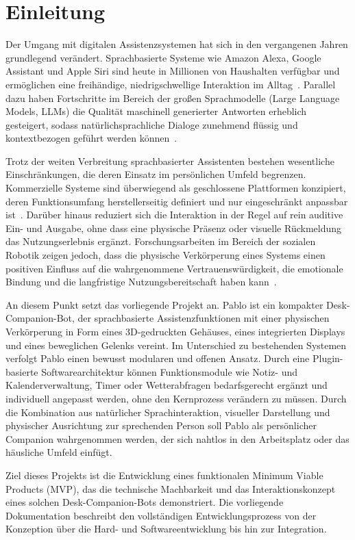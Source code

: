 \section{Einleitung}

Der Umgang mit digitalen Assistenzsystemen hat sich in den vergangenen Jahren grundlegend verändert.
Sprachbasierte Systeme wie Amazon Alexa, Google Assistant und Apple Siri sind heute in Millionen von Haushalten verfügbar und ermöglichen eine freihändige, niedrigschwellige Interaktion im Alltag~\cite{hoy2018alexa, kepuska2018next}.
Parallel dazu haben Fortschritte im Bereich der großen Sprachmodelle (Large Language Models, LLMs) die Qualität maschinell generierter Antworten erheblich gesteigert, sodass natürlichsprachliche Dialoge zunehmend flüssig und kontextbezogen geführt werden können~\cite{zhao2023survey}.

Trotz der weiten Verbreitung sprachbasierter Assistenten bestehen wesentliche Einschränkungen, die deren Einsatz im persönlichen Umfeld begrenzen.
Kommerzielle Systeme sind überwiegend als geschlossene Plattformen konzipiert, deren Funktionsumfang herstellerseitig definiert und nur eingeschränkt anpassbar ist~\cite{bentley2018understanding}.
Darüber hinaus reduziert sich die Interaktion in der Regel auf rein auditive Ein- und Ausgabe, ohne dass eine physische Präsenz oder visuelle Rückmeldung das Nutzungserlebnis ergänzt.
Forschungsarbeiten im Bereich der sozialen Robotik zeigen jedoch, dass die physische Verkörperung eines Systems einen positiven Einfluss auf die wahrgenommene Vertrauenswürdigkeit, die emotionale Bindung und die langfristige Nutzungsbereitschaft haben kann~\cite{li2015benefit, belpaeme2018social}.

An diesem Punkt setzt das vorliegende Projekt an.
Pablo ist ein kompakter Desk-Companion-Bot, der sprachbasierte Assistenzfunktionen mit einer physischen Verkörperung in Form eines 3D-gedruckten Gehäuses, eines integrierten Displays und eines beweglichen Gelenks vereint.
Im Unterschied zu bestehenden Systemen verfolgt Pablo einen bewusst modularen und offenen Ansatz. Durch eine Plugin-basierte Softwarearchitektur können Funktionsmodule wie Notiz- und Kalenderverwaltung, Timer oder Wetterabfragen bedarfsgerecht ergänzt und individuell angepasst werden, ohne den Kernprozess verändern zu müssen.
Durch die Kombination aus natürlicher Sprachinteraktion, visueller Darstellung und physischer Ausrichtung zur sprechenden Person soll Pablo als persönlicher Companion wahrgenommen werden, der sich nahtlos in den Arbeitsplatz oder das häusliche Umfeld einfügt.

Ziel dieses Projekts ist die Entwicklung eines funktionalen Minimum Viable Products (MVP), das die technische Machbarkeit und das Interaktionskonzept eines solchen Desk-Companion-Bots demonstriert.
Die vorliegende Dokumentation beschreibt den vollständigen Entwicklungsprozess von der Konzeption über die Hard- und Softwareentwicklung bis hin zur Integration.